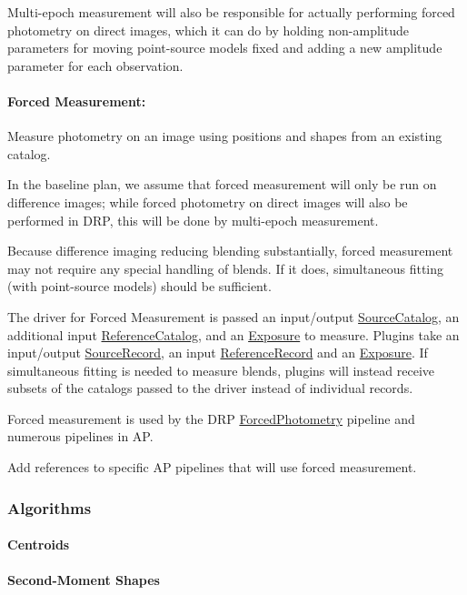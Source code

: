 Multi-epoch measurement will also be responsible for actually performing forced photometry on direct images, which it can do by holding non-amplitude parameters for moving point-source models fixed and adding a new amplitude parameter for each observation.

\paragraph{Forced Measurement:} Measure photometry on an image using positions and shapes from an existing catalog.

In the baseline plan, we assume that forced measurement will only be run on difference images; while forced photometry on direct images will also be performed in DRP, this will be done by multi-epoch measurement.

Because difference imaging reducing blending substantially, forced measurement may not require any special handling of blends.  If it does, simultaneous fitting (with point-source models) should be sufficient.

The driver for Forced Measurement is passed an input/output \hyperref[sec:spTablesSource]{SourceCatalog}, an additional input \hyperref[sec:spTablesReference]{ReferenceCatalog}, and an \hyperref[sec:spImagesExposure]{Exposure} to measure.  Plugins take an input/output \hyperref[sec:spTablesSource]{SourceRecord}, an input \hyperref[sec:spTablesReference]{ReferenceRecord} and an \hyperref[sec:spImagesExposure]{Exposure}.  If simultaneous fitting is needed to measure blends, plugins will instead receive subsets of the catalogs passed to the driver instead of individual records.

Forced measurement is used by the DRP \hyperref[sec:drpForcedPhotometry]{ForcedPhotometry} pipeline and numerous pipelines in AP.

\begin{note}[TODO]
Add references to specific AP pipelines that will use forced measurement.
\end{note}

\subsubsection{Algorithms}
\paragraph{Centroids}
\paragraph{Second-Moment Shapes}
